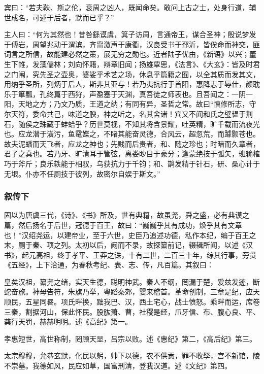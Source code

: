 \documentclass[]{article}
\begin{document}
宾曰：``若夫鞅、斯之伦，衰周之凶人，既闻命矣。敢问上古之士，处身行道，辅世成名，可述于后者，默而已乎？''

主人曰：``何为其然也！昔咎繇谟虞，箕子访周，言通帝王，谋合圣神；殷说梦发于傅岩，周望兆动于渭滨，齐甯激声于康衢，汉良受书于邳沂，皆俟命而神交，匪词言之所信，故能建必然之策，展无穷之勋也。近者陆子优由，《新语》以兴；董生下帷，发藻儒林；刘向怀籍，辩章旧闻；扬雄覃思，《法言》、《大玄》：皆及时君之门闱，究先圣之壶奥，婆娑乎术艺之场，休息乎篇籍之囿，以全其质而发其文，用纳乎圣所，列炳于后人，斯非其亚与！若乃夷抗行于首阳，惠降志于辱仕，颜耽乐于箪瓢，孔终篇于西狩，声盈塞于天渊，真吾徒之师表也。且吾闻之：一阴一阳，天地之方；乃文乃质，王道之纳；有同有异，圣哲之常。故曰``慎修所志，守尔天符，委命共己，味道之腴，神之听之，名其舍诸！宾又不闻和氏之璧韫于荆石，随侯之珠藏于蚌蛤乎？历世莫视，不知其将含景耀，吐英精，旷千载而流夜光也。应龙潜于潢污，鱼鼋媟之，不睹其能奋灵德，合风云，超忽荒，而躆颢苍也。故夫泥蟠而天飞者，应龙之神也；先贱而后贵者，和、随之珍也；时暗而久章者，君子之真也。若乃牙、旷清耳于管弦，离娄眇目于豪分；逢蒙绝技于弧矢，班输榷巧于斧斤；良乐轶能于相驭，乌获抗力于千钧；和、鹊发精于针石，研、桑心计于无垠。仆亦不任厕技于彼列，故密尔自娱于斯文。''

\hypertarget{header-n7033}{%
\subsubsection{叙传下}\label{header-n7033}}

固以为唐虞三代，《诗》、《书》所及，世有典籍，故虽尧，舜之盛，必有典谟之篇，然后扬名于后世，冠德于百王，故曰：``巍巍乎其有成功，焕乎其有文章也！''汉绍尧运，以建帝业，至于六世，史臣乃追述功德，私作本纪，编于百王之末，厕于秦、项之列。太初以后，阙而不录，故探纂前记，辍辑所闻，以述《汉书》，起元高祖，终于孝平、王莽之诛，十有二世，二百三十年，综其行事，旁贯《五经》，上下洽通，为春秋考纪、表、志、传，凡百篇。其叙曰：

皇矣汉祖，纂尧之绪，实天生德，聪明神武。秦人不纲，罔漏于楚，爰兹发迹，断蛇奋旅。神母告符，朱旗乃举，粤蹈秦郊，婴来稽首。革命创制，三章是纪，应天顺民，五星同晷。项氏畔换，黜我巴、汉，西土宅心，战士愤怒。乘畔而运，席卷三秦，割据河山，保此怀民。股肱萧、曹，社稷是经，爪牙信、布、腹心良、平、龚行天罚，赫赫明明。述《高纪》第一。

孝惠短世，高世称制，罔顾天显，吕宗以败。述《惠纪》第二，《高后纪》第三。

太宗穆穆，允恭玄默，化民以躬，帅下以德，农不供贡，罪不收孥，宫不新馆，陵不崇墓。我德如风，民应如草，国富刑清，登我汉道。述《文纪》第四。
\end{document}
